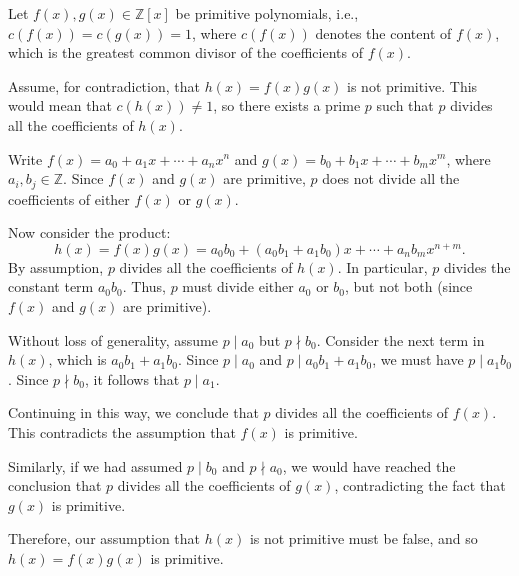 \documentclass{article}
\newenvironment{proofbox}
  {\begin{mdframed}[linewidth=1pt,linecolor=black,backgroundcolor=white]\noindent\ignorespaces}
  {\end{mdframed}}
\begin{document}
\begin{proofbox}
    Let $f(x), g(x) \in \mathbb{Z}[x]$ be primitive polynomials, i.e., $c(f(x)) = c(g(x)) = 1$, where $c(f(x))$ denotes the content of $f(x)$, which is the greatest common divisor of the coefficients of $f(x)$.
    
    Assume, for contradiction, that $h(x) = f(x)g(x)$ is not primitive. This would mean that $c(h(x)) \neq 1$, so there exists a prime $p$ such that $p$ divides all the coefficients of $h(x)$.

    Write $f(x) = a_0 + a_1x + \cdots + a_nx^n$ and $g(x) = b_0 + b_1x + \cdots + b_mx^m$, where $a_i, b_j \in \mathbb{Z}$. Since $f(x)$ and $g(x)$ are primitive, $p$ does not divide all the coefficients of either $f(x)$ or $g(x)$.

    Now consider the product:
    \[
    h(x) = f(x)g(x) = a_0b_0 + (a_0b_1 + a_1b_0)x + \cdots + a_nb_mx^{n+m}.
    \]
    By assumption, $p$ divides all the coefficients of $h(x)$. In particular, $p$ divides the constant term $a_0b_0$. Thus, $p$ must divide either $a_0$ or $b_0$, but not both (since $f(x)$ and $g(x)$ are primitive).

    Without loss of generality, assume $p \mid a_0$ but $p \nmid b_0$. Consider the next term in $h(x)$, which is $a_0b_1 + a_1b_0$. Since $p \mid a_0$ and $p \mid a_0b_1 + a_1b_0$, we must have $p \mid a_1b_0$. Since $p \nmid b_0$, it follows that $p \mid a_1$.

    Continuing in this way, we conclude that $p$ divides all the coefficients of $f(x)$. This contradicts the assumption that $f(x)$ is primitive.

    Similarly, if we had assumed $p \mid b_0$ and $p \nmid a_0$, we would have reached the conclusion that $p$ divides all the coefficients of $g(x)$, contradicting the fact that $g(x)$ is primitive.

    Therefore, our assumption that $h(x)$ is not primitive must be false, and so $h(x) = f(x)g(x)$ is primitive.
\end{proofbox}
\end{document}
